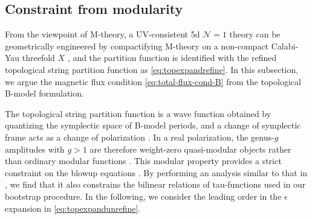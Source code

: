 \documentclass[11pt, a4paper]{article}
\theoremstyle{definition}
\begin{document}
\subsection{Constraint from modularity}\label{sec:topological-modularity}

From the viewpoint of M-theory, a UV-consistent 5d $\mathcal{N}=1$ theory can be geometrically engineered by compactifying M-theory on a non-compact Calabi-Yau threefold $X$ \cite{Witten:1996qb,Intriligator:1997pq}, and the partition function is identified with the refined topological string partition function as \eqref{eq:topexpandrefine}. In this subsection, we argue the magnetic flux condition \eqref{eq:total-flux-cond-B} from the topological B-model formulation.

The topological string partition function is a wave function obtained by quantizing the symplectic space of B-model periods, and a change of symplectic frame acts as a change of polarization \cite{Bershadsky:1993ta,Bershadsky:1993cx,Witten:1993ed,Gunaydin:2006bz}. In a real polarization, the genus-$g$ amplitudes with $g>1$ are therefore weight-zero quasi-modular objects rather than ordinary modular functions \cite{Aganagic:2006wq,Huang:2006hq,Grimm:2007tm}. This modular property provides a strict constraint on the blowup equations \cite{Huang:2017mis}. By performing an analysis similar to that in \cite{Huang:2017mis}, we find that it also constrains the bilinear relations of tau-functions used in our bootstrap procedure. In the following, we consider the leading order in the $\epsilon$ expansion in \eqref{eq:topexpandunrefine}.
\end{document}
